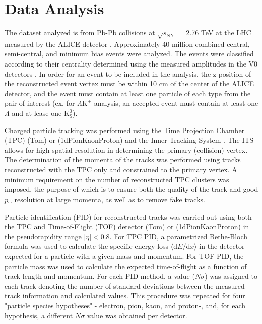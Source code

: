 \documentclass[ALICE,manyauthors]{cernphprep}
\newcommand{\pt}{$p_{\mathrm{T}}$\xspace}
\newcommand{\Lam}{$\Lambda$\xspace}
\newcommand{\Ks}{$\mathrm{K^{0}_{S}}$\xspace}
\newcommand{\LamKchP}{$\Lambda\mathrm{K^{+}}$\xspace}
\begin{document}
\section{Data Analysis}
\label{sec:DataAnalysis}

The dataset analyzed is from Pb-Pb collisions at $\sqrt{s_{\mathrm{NN}}}$ = 2.76 TeV at the LHC measured by the ALICE detector \cite{1748-0221-3-08-S08002}.
Approximately 40 million combined central, semi-central, and minimum bias events were analyzed.
The events were classified according to their centrality determined using the measured amplitudes in the V0 detectors \cite{Abelev:2013qoq}.  
In order for an event to be included in the analysis, the z-position of the reconstructed event vertex must be within 10 cm of the center of the ALICE detector, and the event must contain at least one particle of each type from the pair of interest (ex. for \LamKchP analysis, an accepted event must contain at least one \Lam and at lease one \Ks). 

Charged particle tracking was performed using the Time Projection Chamber (TPC) \cite{2010NIMPA.622..316A} (Tom) or \cite{Dellacasa:451098} (1dPionKaonProton) and the Inner Tracking System \cite{1748-0221-3-08-S08002}.  
The ITS allows for high spatial resolution in determining the primary (collision) vertex.
The determination of the momenta of the tracks was performed using tracks reconstructed with the TPC only and constrained to the primary vertex.
A minimum requirement on the number of reconstructed TPC clusters was imposed, the purpose of which is to ensure both the quality of the track and good \pt resolution at large momenta, as well as to remove fake tracks.

Particle identification (PID) for reconstructed tracks was carried out using both the TPC and Time-of-Flight (TOF) detector \cite{Abelev:2014ffa, Akindinov:2013tea} (Tom) or \cite{Cortese:545834} (1dPionKaonProton) in the pseudorapidity range $|\eta| < 0.8$.  
For TPC PID, a parametrized Bethe-Bloch formula was used to calculate the specific energy loss $\langle \mathrm{d}E/\mathrm{d}x \rangle$ in the detector expected for a particle with a given mass and momentum.  
For TOF PID, the particle mass was used to calculate the expected time-of-flight as a function of track length and momentum.  
For each PID method, a value ($N\sigma$) was assigned to each track denoting the number of standard deviations between the measured track information and calculated values.  
This procedure was repeated for four "particle species hypotheses" - electron, pion, kaon, and proton-, and, for each hypothesis, a different $N\sigma$ value was obtained per detector.
\end{document}
